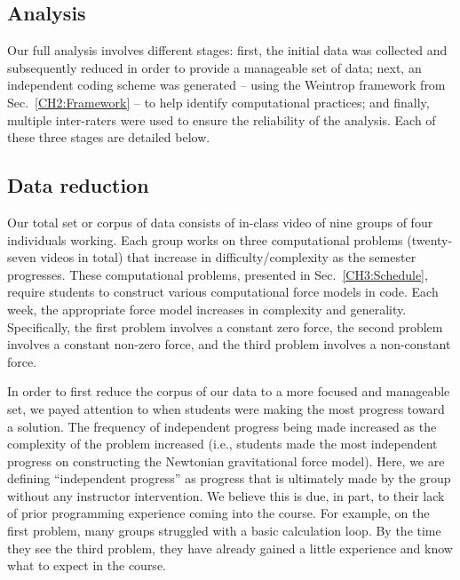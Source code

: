 \documentclass{msuphddissertation}
\begin{document}
\begin{doublespace}
\section{Analysis}\label{CH5:Analysis}

Our full analysis involves different stages: first, the initial data was collected and subsequently reduced in order to provide a manageable set of data; next, an independent coding scheme was generated -- using the Weintrop framework from Sec.~\ref{CH2:Framework} -- to help identify computational practices; and finally, multiple inter-raters were used to ensure the reliability of the analysis.  Each of these three stages are detailed below.

\subsection{Data reduction}

Our total set or corpus of data consists of in-class video of nine groups of four individuals working.  Each group works on three computational problems (twenty-seven videos in total) that increase in difficulty/complexity as the semester progresses.  These computational problems, presented in Sec.~\ref{CH3:Schedule}, require students to construct various computational force models in code.  Each week, the appropriate force model increases in complexity and generality.  Specifically, the first problem involves a constant zero force, the second problem involves a constant non-zero force, and the third problem involves a non-constant force.

In order to first reduce the corpus of our data to a more focused and manageable set, we payed attention to when students were making the most progress toward a solution.  The frequency of independent progress being made increased as the complexity of the problem increased (i.e., students made the most independent progress on constructing the Newtonian gravitational force model).  Here, we are defining ``independent progress'' as progress that is ultimately made by the group without any instructor intervention.  We believe this is due, in part, to their lack of prior programming experience coming into the course.  For example, on the first problem, many groups struggled with a basic calculation loop.  By the time they see the third problem, they have already gained a little experience and know what to expect in the course.


\end{doublespace}
\end{document}
